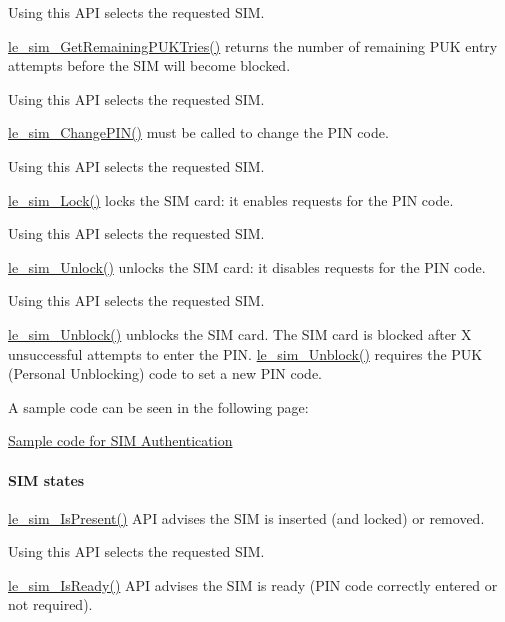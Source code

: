 Using this A\+PI selects the requested S\+IM.

\hyperlink{le__sim__interface_8h_a285eeaa3c5e1977abbe49682145f3d35}{le\+\_\+sim\+\_\+\+Get\+Remaining\+P\+U\+K\+Tries()} returns the number of remaining P\+UK entry attempts before the S\+IM will become blocked.

Using this A\+PI selects the requested S\+IM.

\hyperlink{le__sim__interface_8h_a50b6ce8bae5a073307d1d12550b22c1e}{le\+\_\+sim\+\_\+\+Change\+P\+I\+N()} must be called to change the P\+IN code.

Using this A\+PI selects the requested S\+IM.

\hyperlink{le__sim__interface_8h_a6fab9b258f5af39645b9a200ed202a27}{le\+\_\+sim\+\_\+\+Lock()} locks the S\+IM card\+: it enables requests for the P\+IN code.

Using this A\+PI selects the requested S\+IM.

\hyperlink{le__sim__interface_8h_a4397d51c42ba894f0fa4206341a0dc64}{le\+\_\+sim\+\_\+\+Unlock()} unlocks the S\+IM card\+: it disables requests for the P\+IN code.

Using this A\+PI selects the requested S\+IM.

\hyperlink{le__sim__interface_8h_a234634c9789cdbc8f76629a2272bd2dd}{le\+\_\+sim\+\_\+\+Unblock()} unblocks the S\+IM card. The S\+IM card is blocked after X unsuccessful attempts to enter the P\+IN. \hyperlink{le__sim__interface_8h_a234634c9789cdbc8f76629a2272bd2dd}{le\+\_\+sim\+\_\+\+Unblock()} requires the P\+UK (Personal Unblocking) code to set a new P\+IN code.

A sample code can be seen in the following page\+:
\begin{DoxyItemize}
\item \hyperlink{c_simTestAuthentication}{Sample code for S\+IM Authentication}
\end{DoxyItemize}\hypertarget{c_sim_le_sim_state}{}\paragraph{S\+I\+M states}\label{c_sim_le_sim_state}
\hyperlink{le__sim__interface_8h_aa3255a29cec4358c5e0d68b9ac62ff88}{le\+\_\+sim\+\_\+\+Is\+Present()} A\+PI advises the S\+IM is inserted (and locked) or removed.

Using this A\+PI selects the requested S\+IM.

\hyperlink{le__sim__interface_8h_ace457890856d3692ecb4176f0e892558}{le\+\_\+sim\+\_\+\+Is\+Ready()} A\+PI advises the S\+IM is ready (P\+IN code correctly entered or not required).

